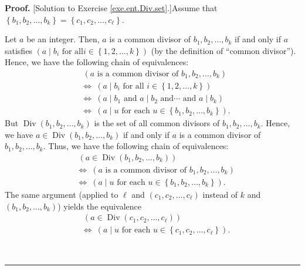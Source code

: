 \documentclass[numbers=enddot,12pt,final,onecolumn,notitlepage]{scrartcl}%
\numberwithin{exer}{subsection}
\theoremstyle{definition}
\newenvironment{fineprint}{\begin{small}}{\end{small}}
\newenvironment{proof}[1][Proof]{\noindent\textbf{#1.} }{\ \rule{0.5em}{0.5em}}
\begin{document}
\begin{fineprint}
\begin{proof}
[Solution to Exercise \ref{exe.ent.Div.set}.]Assume that $\left\{  b_{1}%
,b_{2},\ldots,b_{k}\right\}  =\left\{  c_{1},c_{2},\ldots,c_{\ell}\right\}  $.

Let $a$ be an integer. Then, $a$ is a common divisor of $b_{1},b_{2}%
,\ldots,b_{k}$ if and only if $a$ satisfies $\left(  a\mid b_{i}\text{ for all
}i\in\left\{  1,2,\ldots,k\right\}  \right)  $ (by the definition of
\textquotedblleft common divisor\textquotedblright). Hence, we have the
following chain of equivalences:%
\begin{align*}
&  \ \left(  a\text{ is a common divisor of }b_{1},b_{2},\ldots,b_{k}\right)
\\
&  \Longleftrightarrow\ \left(  a\mid b_{i}\text{ for all }i\in\left\{
1,2,\ldots,k\right\}  \right) \\
&  \Longleftrightarrow\ \left(  a\mid b_{1}\text{ and }a\mid b_{2}\text{ and
}\cdots\text{ and }a\mid b_{k}\right) \\
&  \Longleftrightarrow\ \left(  a\mid u\text{ for each }u\in\left\{
b_{1},b_{2},\ldots,b_{k}\right\}  \right)  .
\end{align*}
But $\operatorname*{Div}\left(  b_{1},b_{2},\ldots,b_{k}\right)  $ is the set
of all common divisors of $b_{1},b_{2},\ldots,b_{k}$. Hence, we have
$a\in\operatorname*{Div}\left(  b_{1},b_{2},\ldots,b_{k}\right)  $ if and only
if $a$ is a common divisor of $b_{1},b_{2},\ldots,b_{k}$. Thus, we have the
following chain of equivalences:%
\begin{align}
&  \ \left(  a\in\operatorname*{Div}\left(  b_{1},b_{2},\ldots,b_{k}\right)
\right) \nonumber\\
&  \Longleftrightarrow\ \left(  a\text{ is a common divisor of }b_{1}%
,b_{2},\ldots,b_{k}\right) \nonumber\\
&  \Longleftrightarrow\ \left(  a\mid u\text{ for each }u\in\left\{
b_{1},b_{2},\ldots,b_{k}\right\}  \right)  . \label{sol.ent.Div.set.1}%
\end{align}
The same argument (applied to $\ell$ and $\left(  c_{1},c_{2},\ldots,c_{\ell
}\right)  $ instead of $k$ and $\left(  b_{1},b_{2},\ldots,b_{k}\right)  $)
yields the equivalence%
\begin{align}
&  \ \left(  a\in\operatorname*{Div}\left(  c_{1},c_{2},\ldots,c_{\ell
}\right)  \right) \nonumber\\
&  \Longleftrightarrow\ \left(  a\mid u\text{ for each }u\in\left\{
c_{1},c_{2},\ldots,c_{\ell}\right\}  \right)  . \label{sol.ent.Div.set.2}%
\end{align}



\end{proof}
\end{fineprint}
\end{document}
